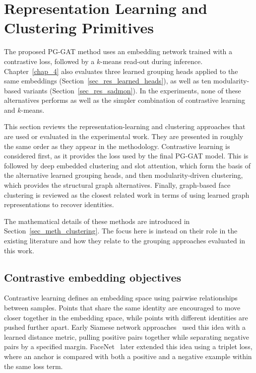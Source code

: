 \section{Representation Learning and Clustering Primitives}
\label{sec_lit_rep_learn}

The proposed PG-GAT method uses an embedding network trained with a contrastive loss,
followed by a $k$-means read-out during inference.
Chapter~\ref{chap_4} also evaluates three learned grouping heads
applied to the same embeddings (Section~\ref{sec_res_learned_heads}),
as well as ten modularity-based variants (Section~\ref{sec_res_sadmon}).
In the experiments,
none of these alternatives performs as well as the simpler combination of contrastive learning and $k$-means.

This section reviews the representation-learning and clustering approaches
that are used or evaluated in the experimental work.
They are presented in roughly the same order as they appear in the methodology.
Contrastive learning is considered first,
as it provides the loss used by the final PG-GAT model.
This is followed by deep embedded clustering and slot attention,
which form the basis of the alternative learned grouping heads,
and then modularity-driven clustering, which provides the structural graph alternatives.
Finally, graph-based face clustering is reviewed
as the closest related work in terms of using learned graph representations to recover identities.

The mathematical details of these methods are introduced in Section~\ref{sec_meth_clustering}.
The focus here is instead on their role in the existing literature
and how they relate to the grouping approaches evaluated in this work.

\subsection{Contrastive embedding objectives}
\label{sec_lit_rep_learn_contrastive}

Contrastive learning defines an embedding space using pairwise relationships between samples.
Points that share the same identity are encouraged to move closer together in the embedding space,
while points with different identities are pushed further apart.
Early Siamese network approaches~\cite{hadsell2006contrastive, chopra2005contrastive}
used this idea with a learned distance metric,
pulling positive pairs together while separating negative pairs by a specified margin.
FaceNet~\cite{schroff2015facenet} later extended this idea using a triplet loss,
where an anchor is compared with both a positive and a negative example within the same loss term.

